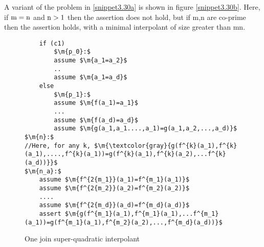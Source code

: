 A variant of the problem in \ref{snippet3.30a} is shown in figure \ref{snippet3.30b}.
Here, if $\mathrm{m=n}$ and $\mathrm{n>1}$ then the assertion does not hold, but if m,n are co-prime then the assertion holds, with a minimal interpolant of size greater than mn.


\begin{figure}
\begin{lstlisting}
	if (c1)
		$\m{p_0}:$ 
		assume $\m{a_1=a_2}$
		..
		assume $\m{a_1=a_d}$
	else
		$\m{p_1}:$
		assume $\m{f(a_1)=a_1}$
		...
		assume $\m{f(a_d)=a_d}$
		assume $\m{g(a_1,a_1....,a_1)=g(a_1,a_2,...,a_d)}$
$\m{n}:$
//Here, for any k, $\m{\textcolor{gray}{g(f^{k}(a_1),f^{k}(a_1),....,f^{k}(a_1))=g(f^{k}(a_1),f^{k}(a_2),...f^{k}(a_d))}}$
$\m{n_a}:$
	assume $\m{f^{2{m_1}}(a_1)=f^{m_1}(a_1)}$ 
	assume $\m{f^{2{m_2}}(a_2)=f^{m_2}(a_2)}$ 
	....
	assume $\m{f^{2{m_d}}(a_d)=f^{m_d}(a_d)}$ 
	assert $\m{g(f^{m_1}(a_1),f^{m_1}(a_1),...f^{m_1}(a_1))=g(f^{m_1}(a_1),f^{m_2}(a_2),...,f^{m_d}(a_d))}$ 
\end{lstlisting}
\caption{One join super-quadratic interpolant}
\label{snippet3.30c}
\end{figure}

